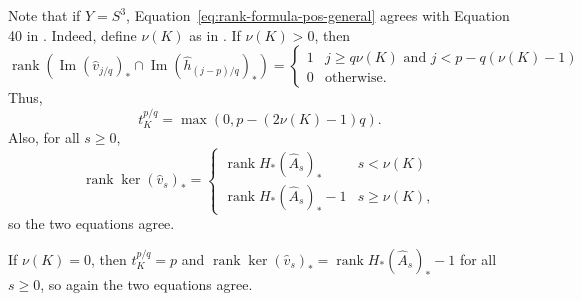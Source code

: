 \documentclass{article}
\theoremstyle{remark}
\numberwithin{equation}{section}
\numberwithin{table}{section}
\newcommand{\wh}{\widehat}
\DeclareMathOperator{\im}{Im}
\DeclareMathOperator{\rank}{rank}
\renewcommand{\(}{\left(}
\renewcommand{\)}{\right)}
\begin{document}
Note that if $Y=S^3$, Equation~\ref{eq:rank-formula-pos-general} agrees with Equation 40 in \cite{oz-sz-rational}. Indeed, define $\nu(K)$ as in \cite{oz-sz-rational}. If $\nu(K)>0$, then
$$\rank\left(\im(\wh v_{j/q})_* \cap \im(\wh h_{(j-p)/q})_*\right) = \begin{cases}
    1 & j\ge q\nu(K) \text{ and } j<p-q(\nu(K)-1) \\
    0 & \text{otherwise.}
\end{cases}$$ Thus,
$$t_K^{p/q}=\max(0,p-(2\nu(K)-1)q).$$ Also, for all $s\ge 0$,
$$\rank\ker(\wh v_s)_*=\begin{cases}
    \rank H_*(\wh A_s)_* & s<\nu(K) \\
    \rank H_*(\wh A_s)_*-1 & s\ge\nu(K),
\end{cases}$$ so the two equations agree. 


If $\nu(K)=0$, then $t_K^{p/q}=p$ and $\rank\ker(\wh v_s)_*=\rank H_*(\wh A_s)_*-1$ for all $s\ge 0$, so again the two equations agree.
\end{document}
